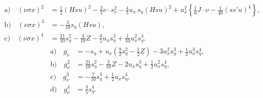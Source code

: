 ﻿\documentclass[11pt]{article}
\begin{document}
\[
\tag{7}
\begin{aligned}
\mathrm{a)}\quad (\nu\sigma x)^2
&=\frac12(Hsu)^2-\frac25\nu\cdot s_\nu^2-
\frac45u_x\,s_\eta(Hsu)^2
+u_x^2\left\{\frac16J\cdot\nu-\frac1{40}(ss'u)^4\right\},\\
\mathrm{b)}\quad (\nu\sigma x)^3&=-\frac3{10}s_\eta(Hsu),\\
\mathrm{c)}\quad (\nu\sigma x)^4&=\frac{21}{10}s_\eta^2-\frac3{10}Z-
\frac65u_xs_\eta^3+\frac1{10}u_x^2s_\eta^4.
\end{aligned}
\]
\[
\tag{8}
\begin{aligned}
\mathrm{a)}\quad g_\nu&=-s_\eta+u_x\left(\frac92s_\eta^2-\frac12Z\right)-3u_x^2s_\eta^3+\frac12u_x^3s_\eta^4,\\
\mathrm{b)}\quad g_\nu^2&=\frac{21}{10}s_\eta^2-\frac3{10}Z-2u_xs_\eta^3+\frac12u_x^2s_\eta^4,\\
\mathrm{c)}\quad g_\nu^3&=-\frac7{10}s_\eta^3+\frac12u_xs_\eta^4,\\
\mathrm{d)}\quad g_\nu^4&=\frac35s_\eta^4.
\end{aligned}
\]
\end{document}
